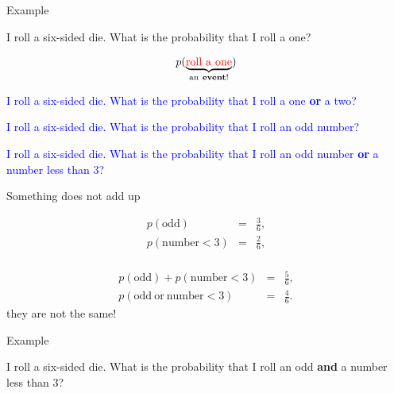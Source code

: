 \begin{frame}{Example}

  I roll a six-sided die. What is the probability that I roll a one?

  {
    \begin{eqnarray*}
      p(\underbrace{\mathrm{\color{red}{roll~a~one}}}_{\mathrm{an~\textbf{event}!}}) 
    \end{eqnarray*}
  }

  {

    \textcolor<3>{blue}{I roll a six-sided die. What is the
      probability that I roll a one \textbf{or} a two?}

  }

  {

    \textcolor<4>{blue}{I roll a six-sided die. What is the
      probability that I roll an odd number?}

  }

  {

    \textcolor<5>{blue}{I roll a six-sided die. What is the
      probability that I roll an odd number \textbf{or} a number less
      than 3?}

  }

  
\end{frame}


\begin{frame}{Something does not add up}

  \begin{eqnarray*}
    p(\mathrm{odd}) & = & \frac{3}{6}, \\
    p(\mathrm{number}<3) & = & \frac{2}{6}, \\
  \end{eqnarray*}

  {

    \begin{eqnarray*}
      p(\mathrm{odd}) + p(\mathrm{number}<3) & = & \frac{5}{6}, \\
      p(\mathrm{odd~or~\mathrm{number}<3}) & = & \frac{4}{6}.
    \end{eqnarray*}
    they are not the same!

  }

  
\end{frame}


\begin{frame}{Example}

  I roll a six-sided die. What is the probability that I roll an odd
  \textbf{and} a number less than 3?
  
\end{frame}

